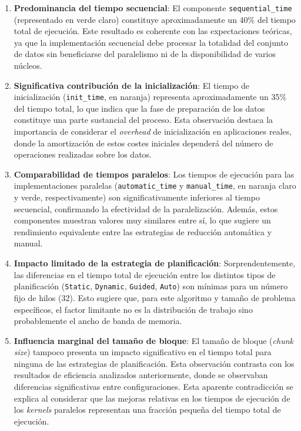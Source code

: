         \begin{enumerate}
        
            \item \textbf{Predominancia del tiempo secuencial}: El componente \texttt{sequential\_time} (representado en verde claro) constituye aproximadamente un 40\% del tiempo total de ejecución. Este resultado es coherente con las expectaciones teóricas, ya que la implementación secuencial debe procesar la totalidad del conjunto de datos sin beneficiarse del paralelismo ni de la disponibilidad de varios núcleos.
    
            \item \textbf{Significativa contribución de la inicialización}: El tiempo de inicialización (\texttt{init\_time}, en naranja) representa aproximadamente un 35\% del tiempo total, lo que indica que la fase de preparación de los datos constituye una parte sustancial del proceso. Esta observación destaca la importancia de considerar el \textit{overhead} de inicialización en aplicaciones reales, donde la amortización de estos costes iniciales dependerá del número de operaciones realizadas sobre los datos.
        
            \item \textbf{Comparabilidad de tiempos paralelos}: Los tiempos de ejecución para las implementaciones paralelas (\texttt{automatic\_time} y \texttt{manual\_time}, en naranja claro y verde, respectivamente) son significativamente inferiores al tiempo secuencial, confirmando la efectividad de la paralelización. Además, estos componentes muestran valores muy similares entre sí, lo que sugiere un rendimiento equivalente entre las estrategias de reducción automática y manual.
    
            \item \textbf{Impacto limitado de la estrategia de planificación}: Sorprendentemente, las diferencias en el tiempo total de ejecución entre los distintos tipos de planificación (\texttt{Static}, \texttt{Dynamic}, \texttt{Guided}, \texttt{Auto}) son mínimas para un número fijo de hilos (32). Esto sugiere que, para este algoritmo y tamaño de problema específicos, el factor limitante no es la distribución de trabajo sino probablemente el ancho de banda de memoria.
    
            \item \textbf{Influencia marginal del tamaño de bloque}: El tamaño de bloque (\textit{chunk size}) tampoco presenta un impacto significativo en el tiempo total para ninguna de las estrategias de planificación. Esta observación contrasta con los resultados de eficiencia analizados anteriormente, donde se observaban diferencias significativas entre configuraciones. Esta aparente contradicción se explica al considerar que las mejoras relativas en los tiempos de ejecución de los \textit{kernels} paralelos representan una fracción pequeña del tiempo total de ejecución.
            
        \end{enumerate}
    
